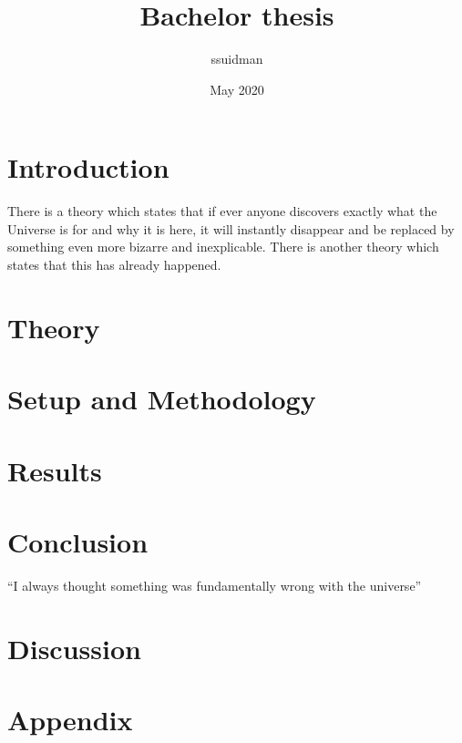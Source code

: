 \documentclass{article}
\title{Bachelor thesis}
\author{ssuidman }
\date{May 2020}
\begin{document}
\maketitle

\section{Introduction}
There is a theory which states that if ever anyone discovers exactly what the Universe is for and why it is here, it will instantly disappear and be replaced by something even more bizarre and inexplicable.
There is another theory which states that this has already happened.

\section{Theory}

\section{Setup and Methodology}

\section{Results}

\section{Conclusion}
``I always thought something was fundamentally wrong with the universe'' \citep{adams1995hitchhiker}

\section{Discussion}

\section{Appendix}




\end{document}
